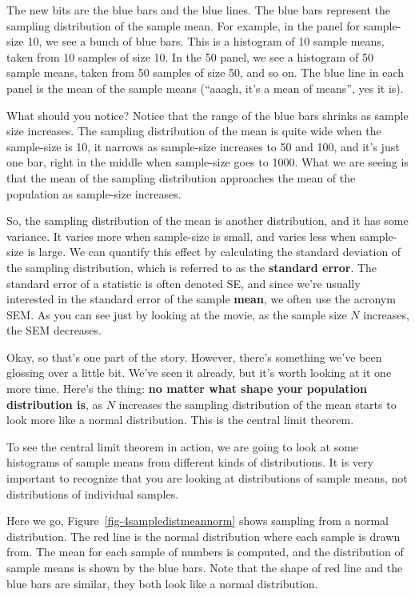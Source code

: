 \documentclass[
  letterpaper,
  DIV=11,
  numbers=noendperiod]{scrreprt}
\begin{document}
The new bits are the blue bars and the blue lines. The blue bars
represent the sampling distribution of the sample mean. For example, in
the panel for sample-size 10, we see a bunch of blue bars. This is a
histogram of 10 sample means, taken from 10 samples of size 10. In the
50 panel, we see a histogram of 50 sample means, taken from 50 samples
of size 50, and so on. The blue line in each panel is the mean of the
sample means (``aaagh, it's a mean of means'', yes it is).

What should you notice? Notice that the range of the blue bars shrinks
as sample size increases. The sampling distribution of the mean is quite
wide when the sample-size is 10, it narrows as sample-size increases to
50 and 100, and it's just one bar, right in the middle when sample-size
goes to 1000. What we are seeing is that the mean of the sampling
distribution approaches the mean of the population as sample-size
increases.

So, the sampling distribution of the mean is another distribution, and
it has some variance. It varies more when sample-size is small, and
varies less when sample-size is large. We can quantify this effect by
calculating the standard deviation of the sampling distribution, which
is referred to as the \textbf{standard error}. The standard error of a
statistic is often denoted SE, and since we're usually interested in the
standard error of the sample \textbf{mean}, we often use the acronym
SEM. As you can see just by looking at the movie, as the sample size
\(N\) increases, the SEM decreases.

Okay, so that's one part of the story. However, there's something we've
been glossing over a little bit. We've seen it already, but it's worth
looking at it one more time. Here's the thing: \textbf{no matter what
shape your population distribution is}, as \(N\) increases the sampling
distribution of the mean starts to look more like a normal distribution.
This is the central limit theorem.

To see the central limit theorem in action, we are going to look at some
histograms of sample means from different kinds of distributions. It is
very important to recognize that you are looking at distributions of
sample means, not distributions of individual samples.

Here we go, Figure~\ref{fig-4sampledistmeannorm} shows sampling from a
normal distribution. The red line is the normal distribution where each
sample is drawn from. The mean for each sample of numbers is computed,
and the distribution of sample means is shown by the blue bars. Note
that the shape of red line and the blue bars are similar, they both look
like a normal distribution.
\end{document}
